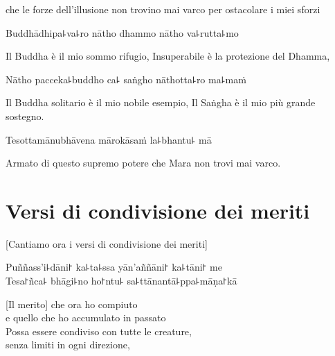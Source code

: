   \begin{english} 
che le forze dell'illusione non trovino mai varco per ostacolare i miei sforzi
  \end{english}

Buddhādhipa꜕va꜕ro nātho dhammo nātho va꜕rutta꜕mo\\

  \begin{english}
Il Buddha è il mio sommo rifugio, Insuperabile è la protezione del Dhamma,
  \end{english}

Nātho pacceka꜕buddho ca꜕ saṅgho nāthotta꜕ro ma꜕maṁ\\

  \begin{english}
Il Buddha solitario è il mio nobile esempio,
Il Saṅgha è il mio più grande sostegno.
  \end{english}

Tesottamānubhāvena mārokāsaṁ la꜕bhantu꜕ mā

  \begin{english}
Armato di questo supremo potere che Mara non trovi mai varco.
  \end{english}

\clearpage

\chapter[Condivisione dei meriti]{Versi di condivisione dei meriti}


\begin{leader}
\end{leader}

   \begin{english}
  [Cantiamo ora i versi di condivisione dei meriti] 
\end{english}     


Puññass'i꜕dāni꜓ ka꜕ta꜕ssa yān'aññāni꜓ ka꜕tāni꜓ me\\
Tesa꜓ñca꜕ bhāgi꜕no ho꜓ntu꜕ sa꜕ttānantā꜕ppa꜕māṇa꜓kā

\begin{english}
 [Il merito] che ora ho compiuto\\
 e quello che ho accumulato in passato \\
Possa essere condiviso con tutte le creature,\\
 senza limiti in ogni direzione,
\end{english}


